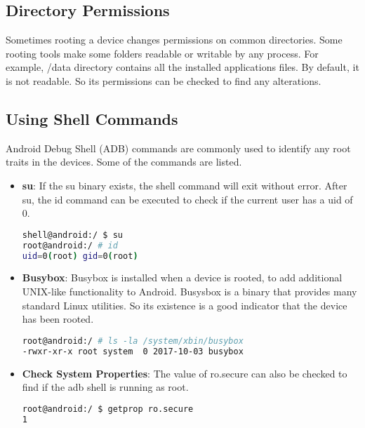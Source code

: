 \subsection{Directory Permissions}
    Sometimes rooting a device changes permissions on common directories. Some rooting tools make some folders readable or writable by any process. For example, /data directory contains all the installed applications files. By default, it is not readable. So its permissions can be checked to find any alterations.
    
\subsection{Using Shell Commands}
    Android Debug Shell (ADB) commands are commonly used to identify any root traits in the devices. Some of the commands are listed.
    \begin{itemize}
        \item \textbf{su}: If the su binary exists, the shell command will exit without error. After su, the id command can be executed to check if the current user has a uid of 0.
        
        \begin{lstlisting}[language=bash,caption={The su process is given uid 0}, captionpos=b, label=listing:sparql_getallindividuals,
   basicstyle=\ttfamily]
shell@android:/ $ su 
root@android:/ # id
uid=0(root) gid=0(root)
        \end{lstlisting}
        
        \item \textbf{Busybox}: Busybox is installed when a device is rooted, to add additional UNIX-like functionality to Android. Busysbox is a binary that provides many standard Linux utilities. So its existence is a good indicator that the device has been rooted.
        
        \begin{lstlisting}[language=bash,basicstyle=\tiny,caption={The busybox binary in system folder (omitting timestamp)}, captionpos=b, label=listing:sparql_getallindividuals,
   basicstyle=\ttfamily]
root@android:/ # ls -la /system/xbin/busybox
-rwxr-xr-x root system  0 2017-10-03 busybox
        \end{lstlisting}
        
        \item \textbf{Check System Properties}: The value of ro.secure can also be checked to find if the adb shell is running as root.
        \begin{lstlisting}[language=bash,caption={The value 1 means that the shell runs in secure mode}, captionpos=b, label=listing:sparql_getallindividuals,
   basicstyle=\ttfamily]
root@android:/ $ getprop ro.secure            
1
    \end{lstlisting}
    \end{itemize}
    
        
    
